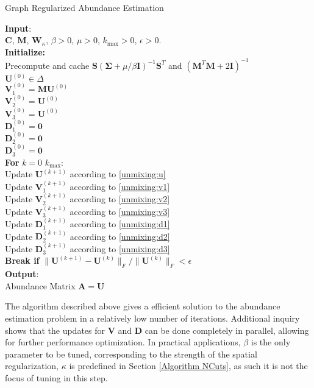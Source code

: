 \begin{algorithm}[H]
  \caption{Graph Regularized Abundance Estimation}
  \textbf{Input}: \\
  \quad  $\mathbf{C}$, $\mathbf{M}$, $\mathbf{W}_{\kappa}$, $\beta > 0$, $\mu > 0$, $k_{\text{max}} > 0$, $\epsilon > 0$.
  \\
  \textbf{Initialize:} 
  \\
  \quad Precompute and cache $\mathbf{S} (\mathbf{\Sigma} + \mu / \beta \mathbf{I})^{-1} \mathbf{S}^T$ and $(\mathbf{M}^T \mathbf{M} + 2\mathbf{I})^{-1}$\\
  \quad $\mathbf{U}^{(0)}  \in \Delta$ \\
  \quad $\mathbf{V}_1^{(0)} = \mathbf{MU}^{(0)}$ \\
  \quad $\mathbf{V}_2^{(0)} = \mathbf{U}^{(0)}$ \\
  \quad $\mathbf{V}_3^{(0)} = \mathbf{U}^{(0)}$ \\
  \quad $\mathbf{D}_1^{(0)} = \mathbf{0}$ \\
  \quad $\mathbf{D}_2^{(0)} = \mathbf{0}$ \\
  \quad $\mathbf{D}_3^{(0)} = \mathbf{0}$
  \\
  \textbf{For} $k = 0$  $k_{\text{max}}$:\\
  \quad Update $\mathbf{U}^{(k+1)}$ according to \eqref{unmixing:u} \\
  \quad Update $\mathbf{V}_1^{(k+1)}$ according to \eqref{unmixing:v1} \\
  \quad Update $\mathbf{V}_2^{(k+1)}$ according to \eqref{unmixing:v2} \\
  \quad Update $\mathbf{V}_3^{(k+1)}$ according to \eqref{unmixing:v3} \\
  \quad Update $\mathbf{D}_1^{(k+1)}$ according to \eqref{unmixing:d1} \\
  \quad Update $\mathbf{D}_2^{(k+1)}$ according to \eqref{unmixing:d2} \\
  \quad Update $\mathbf{D}_3^{(k+1)}$ according to \eqref{unmixing:d3} \\
  \quad \textbf{Break if } $ \|\mathbf{U}^{(k+1)} - \mathbf{U}^{(k)}\|_F/\|\mathbf{U}^{(k)}\|_F < \epsilon$ \\
  \textbf{Output}:\\
  \quad Abundance Matrix $\mathbf{A} = \mathbf{U}$
\end{algorithm}

The algorithm described above gives a efficient solution to the abundance estimation problem in a relatively low number of iterations. Additional inquiry shows that the updates for $\mathbf{V}$ and $\mathbf{D}$ can be done completely in parallel, allowing for further performance optimization. In practical applications, $\beta$ is the only parameter to be tuned, corresponding to the strength of the spatial regularization, $\kappa$ is predefined in Section \ref{Algorithm NCuts}, as such it is not the focus of tuning in this step. 
